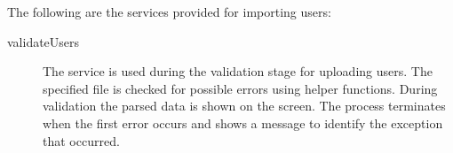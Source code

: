 The following are the services provided for importing users:

\begin{description}

\item[validateUsers] The service is used during the validation stage for uploading users. The specified file is checked for possible errors using helper functions. During validation the parsed data is shown on the screen. The process terminates when the first error occurs and shows a message to identify the exception that occurred.

\end{description}  

